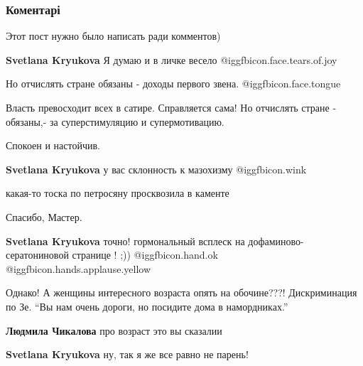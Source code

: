  
 
 
 
 
\subsubsection{Коментарі}
\label{sec:04_12_2021.fb.krjukova_svetlana.1.avtor_poisk.cmt}

\begin{itemize} %
Этот пост нужно было написать ради комментов)

\begin{itemize} %
\textbf{Svetlana Kryukova} Я думаю и в личке весело @igg{fbicon.face.tears.of.joy} 

Но отчислять стране обязаны - доходы первого звена.  @igg{fbicon.face.tongue} 

Власть превосходит всех в сатире. Справляется сама!
Но отчислять стране - обязаны,-
за суперстимуляцию и супермотивацию.

Спокоен и настойчив.

\textbf{Svetlana Kryukova} у вас склонность к мазохизму @igg{fbicon.wink} 

какая-то тоска по петросяну просквозила в каменте

Спасибо, Мастер.

\textbf{Svetlana Kryukova} точно! гормональный всплеск на дофаминово- сератониновой странице ! ;)) @igg{fbicon.hand.ok}  @igg{fbicon.hands.applause.yellow} 
\end{itemize} %


Однако! А женщины интересного возраста опять на обочине???! Дискриминация по
Зе. \enquote{Вы нам очень дороги, но посидите дома в намордниках.}

\begin{itemize} %
\textbf{Людмила Чикалова} про возраст это вы сказалии

\textbf{Svetlana Kryukova} ну, так я же все равно не парень!
\end{itemize} %


\end{itemize}
